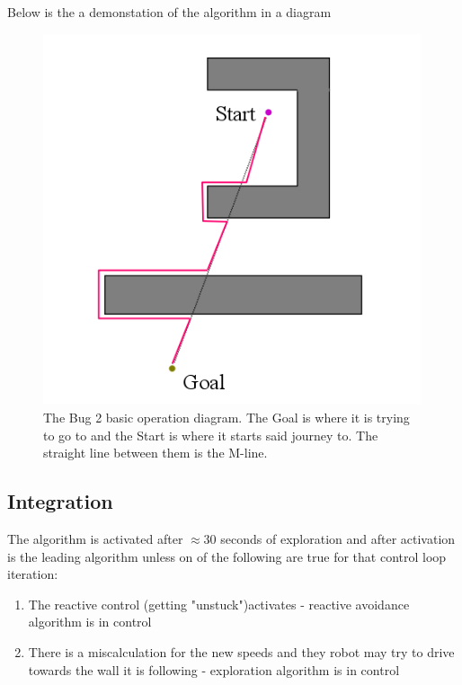 \documentclass[11pt, a4paper]{article}
\begin{document}
Below is the a demonstation of the algorithm in a diagram

\begin{figure}[h]
  \begin{center}
    \includegraphics[width=30em]{../assets/bug-algorithm-diagram.png}
    \caption{The Bug 2 basic operation diagram. The Goal is where it is trying to go to and the Start is where it starts said journey to. The straight line between them is the M-line.}
  \end{center}
\end{figure} 



\subsection{Integration}

The algorithm is activated after $\approx 30$ seconds of exploration\cite{task1_report} and after
activation is the leading algorithm unless on of the following are true for that control loop iteration:

\begin{enumerate}	

	\item The reactive control (getting "unstuck"\cite{task1_report})activates - reactive avoidance algorithm is in control
	\item There is a miscalculation for the new speeds and they robot may try to drive towards the wall it is following - exploration algorithm is in control

\end{enumerate}
\end{document}
